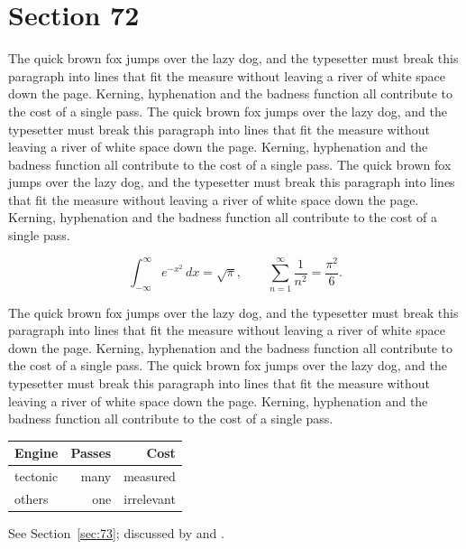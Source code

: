 \documentclass{article}
\begin{document}
\section{Section 72}
\label{sec:72}
The quick brown fox jumps over the lazy dog, and the typesetter must break this paragraph into lines that fit the measure without leaving a river of white space down the page. Kerning, hyphenation and the badness function all contribute to the cost of a single pass. The quick brown fox jumps over the lazy dog, and the typesetter must break this paragraph into lines that fit the measure without leaving a river of white space down the page. Kerning, hyphenation and the badness function all contribute to the cost of a single pass. The quick brown fox jumps over the lazy dog, and the typesetter must break this paragraph into lines that fit the measure without leaving a river of white space down the page. Kerning, hyphenation and the badness function all contribute to the cost of a single pass. 

\begin{equation}\label{eq:72}
\int_{-\infty}^{\infty} e^{-x^{2}}\,dx = \sqrt{\pi}, \qquad
\sum_{n=1}^{\infty} \frac{1}{n^{2}} = \frac{\pi^{2}}{6}.
\end{equation}

The quick brown fox jumps over the lazy dog, and the typesetter must break this paragraph into lines that fit the measure without leaving a river of white space down the page. Kerning, hyphenation and the badness function all contribute to the cost of a single pass. The quick brown fox jumps over the lazy dog, and the typesetter must break this paragraph into lines that fit the measure without leaving a river of white space down the page. Kerning, hyphenation and the badness function all contribute to the cost of a single pass. 

\begin{center}
\begin{tabular}{lrr}
\toprule
Engine & Passes & Cost \\
\midrule
tectonic & many & measured \\
others & one & irrelevant \\
\bottomrule
\end{tabular}
\end{center}

See Section~\ref{sec:73}; discussed by \textcite{k3} and \textcite{l5}.
\end{document}
